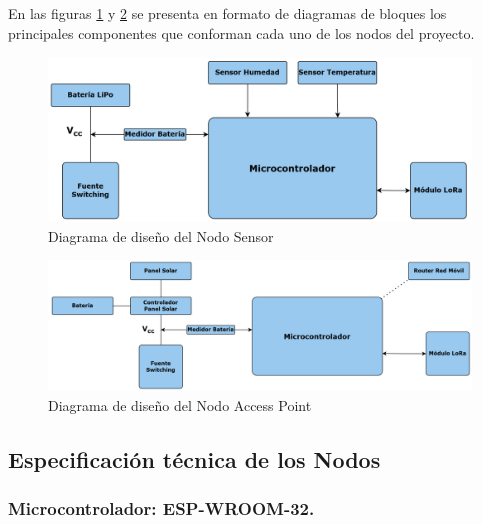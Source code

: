 En las figuras \ref{fig:DisNodoSensor} y \ref{fig:DisNodoAP} se presenta en formato de diagramas de bloques los principales componentes que conforman cada uno de los nodos del proyecto.



\begin{figure}[H]
    \centering
    \includegraphics[width=1\linewidth]{Figures/Hardware/Modulos/nodo_sensor.png}
    \caption{ Diagrama de diseño del Nodo Sensor}
    \label{fig:DisNodoSensor}
\end{figure}

\begin{figure}[H]
    \centering
    \includegraphics[width=1\linewidth]{Figures/Hardware/Modulos/nodo_ap.png}
    \caption{Diagrama de diseño del Nodo Access Point}
    \label{fig:DisNodoAP}
\end{figure}


\subsection{Especificación técnica de los Nodos}
\label{sec:DescrModulos}

\subsubsection{Microcontrolador: ESP-WROOM-32.}

